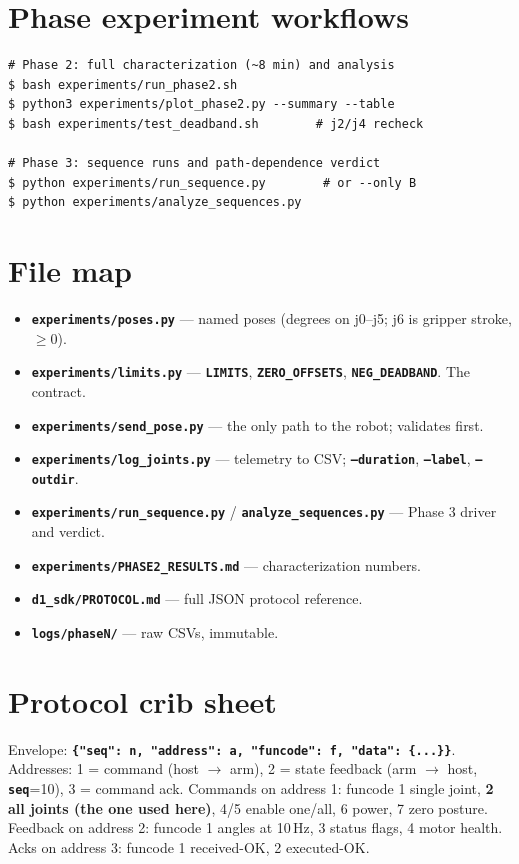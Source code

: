 \documentclass[11pt,twoside,openright]{book}
\newcommand{\code}[1]{\texttt{\bfseries #1}}
\begin{document}
\section{Phase experiment workflows}

\begin{lstlisting}
# Phase 2: full characterization (~8 min) and analysis
$ bash experiments/run_phase2.sh
$ python3 experiments/plot_phase2.py --summary --table
$ bash experiments/test_deadband.sh        # j2/j4 recheck

# Phase 3: sequence runs and path-dependence verdict
$ python experiments/run_sequence.py        # or --only B
$ python experiments/analyze_sequences.py
\end{lstlisting}

\section{File map}

\begin{itemize}
  \item \code{experiments/poses.py} --- named poses (degrees on
    j0--j5; j6 is gripper stroke, $\geq 0$).
  \item \code{experiments/limits.py} --- \code{LIMITS},
    \code{ZERO\_OFFSETS}, \code{NEG\_DEADBAND}. The contract.
  \item \code{experiments/send\_pose.py} --- the only path to the robot;
    validates first.
  \item \code{experiments/log\_joints.py} --- telemetry to CSV;
    \code{--duration}, \code{--label}, \code{--outdir}.
  \item \code{experiments/run\_sequence.py} /
    \code{analyze\_sequences.py} --- Phase 3 driver and verdict.
  \item \code{experiments/PHASE2\_RESULTS.md} --- characterization
    numbers.
  \item \code{d1\_sdk/PROTOCOL.md} --- full JSON protocol reference.
  \item \code{logs/phaseN/} --- raw CSVs, immutable.
\end{itemize}

\section{Protocol crib sheet}

Envelope: \code{\{"seq": n, "address": a, "funcode": f, "data":
\{...\}\}}. Addresses: 1 = command (host $\rightarrow$ arm), 2 = state
feedback (arm $\rightarrow$ host, \code{seq}=10), 3 = command ack.
Commands on address 1: funcode 1 single joint, \textbf{2 all joints
(the one used here)}, 4/5 enable one/all, 6 power, 7 zero posture.
Feedback on address 2: funcode 1 angles at 10\,Hz, 3 status flags,
4 motor health. Acks on address 3: funcode 1 received-OK, 2 executed-OK.
\end{document}
